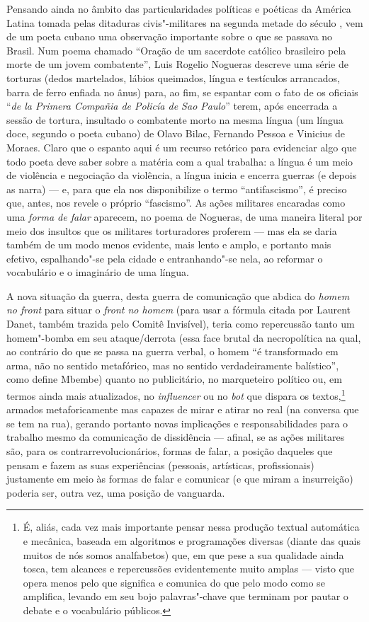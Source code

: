 Pensando ainda no âmbito das particularidades políticas e poéticas da
América Latina tomada pelas ditaduras civis"-militares na segunda metade
do século , vem de um poeta cubano uma observação importante sobre o
que se passava no Brasil. Num poema chamado ``Oração de um sacerdote
católico brasileiro pela morte de um jovem combatente'', Luis Rogelio
Nogueras descreve uma série de torturas (dedos martelados, lábios
queimados, língua e testículos arrancados, barra de ferro enfiada no
ânus) para, ao fim, se espantar com o fato de os oficiais ``\emph{de la
Primera Compañia de Policía de Sao Paulo}'' terem, após encerrada a
sessão de tortura, insultado o combatente morto na mesma língua (um
língua doce, segundo o poeta cubano) de Olavo Bilac, Fernando Pessoa e
Vinicius de Moraes. Claro que o espanto aqui é um recurso retórico para
evidenciar algo que todo poeta deve saber sobre a matéria com a qual
trabalha: a língua é um meio de violência e negociação da violência, a
língua inicia e encerra guerras (e depois as narra) --- e, para que ela
nos disponibilize o termo ``antifascismo'', é preciso que, antes, nos
revele o próprio ``fascismo''. As ações militares encaradas como uma
\emph{forma de falar} aparecem, no poema de Nogueras, de uma maneira
literal por meio dos insultos que os militares torturadores proferem ---
mas ela se daria também de um modo menos evidente, mais lento e amplo, e
portanto mais efetivo, espalhando"-se pela cidade e entranhando"-se nela,
ao reformar o vocabulário e o imaginário de uma língua.

\asterisc

A nova situação da guerra, desta guerra de comunicação que abdica do
\emph{homem no front} para situar o \emph{front no homem} (para usar a
fórmula citada por Laurent Danet, também trazida pelo Comitê Invisível),
teria como repercussão tanto um homem"-bomba em seu ataque/derrota (essa
face brutal da necropolítica na qual, ao contrário do que se passa na
guerra verbal, o homem ``é transformado em arma, não no sentido
metafórico, mas no sentido verdadeiramente balístico'', como define
Mbembe) quanto no publicitário, no marqueteiro político ou, em termos
ainda mais atualizados, no \emph{influencer} ou no \emph{bot} que
dispara os textos,\footnote{É, aliás, cada vez mais importante pensar
  nessa produção textual automática e mecânica, baseada em algoritmos e
  programações diversas (diante das quais muitos de nós somos
  analfabetos) que, em que pese a sua qualidade ainda tosca, tem
  alcances e repercussões evidentemente muito amplas --- visto que opera
  menos pelo que significa e comunica do que pelo modo como se
  amplifica, levando em seu bojo palavras"-chave que terminam por pautar
  o debate e o vocabulário públicos.} armados metaforicamente mas
capazes de mirar e atirar no real (na conversa que se tem na rua),
gerando portanto novas implicações e responsabilidades para o trabalho
mesmo da comunicação de dissidência --- afinal, se as ações militares
são, para os contrarrevolucionários, formas de falar, a posição daqueles
que pensam e fazem as suas experiências (pessoais, artísticas,
profissionais) justamente em meio às formas de falar e comunicar (e que
miram a insurreição) poderia ser, outra vez, uma posição de vanguarda.

